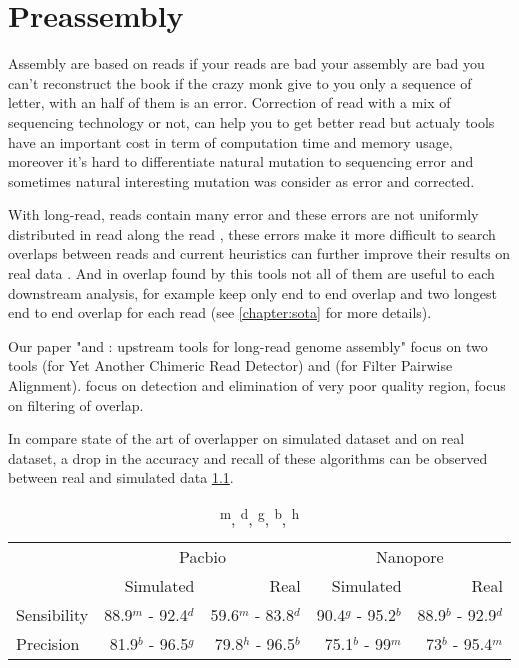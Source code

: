 \documentclass[main.tex]{subfiles}
\begin{document}
\chapter{Preassembly}\label{chapter:preassembly}

Assembly are based on reads if your reads are bad your assembly are bad you can't reconstruct the book if the crazy monk give to you only a sequence of letter, with an half of them is an error. Correction of read with a mix of sequencing technology or not, can help you to get better read but actualy tools have an important cost in term of computation time and memory usage, moreover it's hard to differentiate natural mutation to sequencing error and sometimes natural interesting mutation was consider as error and corrected.

With long-read, reads contain many error and these errors are not uniformly distributed in read along the read \cite{blog_post_error_repartition}, these errors make it more difficult to search overlaps between reads and current heuristics can further improve their results on real data \cite{ovl_bench}.
And in overlap found by this tools not all of them are useful to each downstream analysis, for example \miniasm keep only end to end overlap and \canu two longest end to end overlap for each read (see \ref{chapter:sota} for more details).

Our paper "\yacrd and \fpa: upstream tools for long-read genome assembly" focus on two tools \yacrd (for Yet Another Chimeric Read Detector) and \fpa (for Filter Pairwise Alignment). \yacrd focus on detection and elimination of very poor quality region, \fpa focus on filtering of overlap.

In \cite{ovl_bench} \citeauthor{ovl_bench} compare state of the art of overlapper on simulated dataset and on real dataset, a drop in the accuracy and recall of these algorithms can be observed between real and simulated data \ref{preassembly:tab:ovl_result}.

\begin{table}[ht]
    \centering
    \begin{tabular}{l|rr|rr}
                & \multicolumn{2}{c}{Pacbio}                & \multicolumn{2}{c}{Nanopore}              \\ 
                & Simulated           & Real                & Simulated         & Real                  \\ \hline
    Sensibility & 88.9$^m$ - 92.4$^d$ & 59.6$^m$ - 83.8$^d$ & 90.4$^g$ - 95.2$^b$ & 88.9$^b$ - 92.9$^d$ \\
    Precision   & 81.9$^b$ - 96.5$^g$ & 79.8$^h$ - 96.5$^b$ & 75.1$^b$ - 99$^m$   & 73$^b$ - 95.4$^m$   \\
    \end{tabular}
    \caption{\textsuperscript{m}, \textsuperscript{d}, \textsuperscript{g}, \textsuperscript{b}, \textsuperscript{h}\mhap}
    \label{preassembly:tab:ovl_result}
\end{table}
\end{document}
